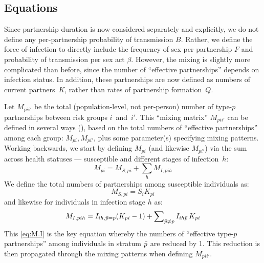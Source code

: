\subsection{Equations}\label{foi.prop.eq}
Since partnership duration is now considered separately and explicitly,
we do not define any per-partnership probability of transmission $B$. %
Rather, we define the force of infection to directly include
the frequency of sex per partnership $F$ and probability of transmission per sex act $\beta$.
However, the mixing is slightly more complicated than before,
since the number of ``effective partnerships'' depends on infection status.
In addition, these partnerships are now defined as numbers of current partners~$K$,
rather than rates of partnership formation~$Q$.
\par
Let $M_{pii'}$ be the total (population-level, not per-person)
number of type-$p$ partnerships between risk groups $i$~and~$i'$.
This ``mixing matrix'' $M_{pii'}$ can be defined in several ways (\eg {}),
based on the total numbers of ``effective partnerships'' among each group: $M_{pi}, M_{pi'}$,
plus some parameter(s) specifying mixing patterns.
Working backwards, we start by defining $M_{pi}$ (and likewise $M_{pi'}$) via
the sum across health statuses --- \ie susceptible and different stages of infection~$h$:
\begin{equation}\label{eq:M.SI}
  M_{pi} = M_{S,pi} + \sum_h M_{I,pih}
\end{equation}
We define the total numbers of partnerships among susceptible individuals as:
\begin{equation}\label{eq:M.S}
  M_{S,pi} = S_{i} K_{pi}
\end{equation}
and likewise for individuals in infection stage $h$ as:
\begin{equation}\label{eq:M.I}
  M_{I,pih} = I_{ih,\bar{p}=p} (K_{pi}-1) + \sum\nolimits_{\bar{p} \ne p} I_{ih\bar{p}}\,K_{pi}
\end{equation}
This \eqref{eq:M.I} is the key equation whereby
the  numbers of ``effective type-$p$ partnerships'' among
individuals in stratum $\bar{p}$ are reduced by 1.
This reduction is then propagated through the mixing patterns when defining $M_{pii'}$.
